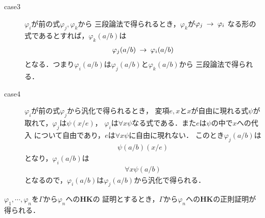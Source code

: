 \begin{metaprf}
\begin{description}
			\item[case3] $\varphi_{i}$が前の式$\varphi_{j},\varphi_{k}$から
				三段論法で得られるとき，$\varphi_{k}$が$\varphi_{j} \hspace{0.25em}\rightarrow\hspace{0.25em} \varphi_{i}$
				なる形の式であるとすれば，$\varphi_{k}(a/b)$は
				\begin{align}
					\varphi_{j}(a/b) \hspace{0.25em}\rightarrow\hspace{0.25em} \varphi_{i}(a/b)
				\end{align}
				となる．つまり$\varphi_{i}(a/b)$は$\varphi_{j}(a/b)$と$\varphi_{k}(a/b)$から
				三段論法で得られる．
				
			\item[case4] $\varphi_{i}$が前の式$\varphi_{j}$から汎化で得られるとき，
				変項$e,x$と$x$が自由に現れる式$\psi$が取れて，$\varphi_{j}$は$\psi(x/e)$，
				$\varphi_{i}$は$\forall x \psi$なる式である．また$e$は$\psi$の中で$x$への代入
				について自由であり，$e$は$\forall x \psi$に自由に現れない．
				このとき$\varphi_{j}(a/b)$は
				\begin{align}
					\psi(a/b)(x/e)
				\end{align}
				となり，$\varphi_{i}(a/b)$は
				\begin{align}
					\forall x \psi(a/b)
				\end{align}
				となるので，$\varphi_{i}(a/b)$は$\varphi_{j}(a/b)$から汎化で得られる．
				\QED
		\end{description}
	\end{metaprf}
	
	\begin{screen}
		\begin{metathm}[どんな証明も正則化できる]
			$\varphi_{1},\cdots,\varphi_{n}$を$\Gamma$から$\varphi_{n}$への{\bf HK}の
			証明とするとき，$\Gamma$から$\varphi_{n}$への{\bf HK}の正則証明が得られる．
		\end{metathm}
	\end{screen}
	
